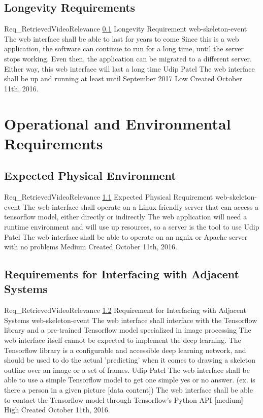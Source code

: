 \documentclass{scrreprt}
\begin{document}
\subsection{Longevity Requirements}
\label{req-longevity}
\requirement
{Req_RetrievedVideoRelevance}
{\ref{req-longevity} Longevity Requirement}
{web-skeleton-event}
{The web interface shall be able to last for years to come}
{Since this is a web application, the software can continue to run for a long time, until the server stops working. Even then, the application can be migrated to a different server. Either way, this web interface will last a long time}
{Udip Patel}
{The web interface shall be up and running at least until September 2017}
{Low}
{Created October 11th, 2016.}


\section{Operational and Environmental Requirements}

\subsection{Expected Physical Environment}
\label{req-op-env}

\requirement
{Req_RetrievedVideoRelevance}
{\ref{req-op-env} Expected Physical Requirement}
{web-skeleton-event}
{The web interface shall operate on a Linux-friendly server that can access a tensorflow model, either directly or indirectly}
{The web application will need a runtime environment and will use up resources, so a server is the tool to use }
{Udip Patel}
{The web interface shall be able to operate on an ngnix or Apache server with no problems}
{Medium}
{Created October 11th, 2016.}


\subsection{Requirements for Interfacing with Adjacent Systems}
\label{req-interfacing}

\requirement
{Req_RetrievedVideoRelevance}
{\ref{req-interfacing} Requirement for Interfacing with Adjacent Systems}
{web-skeleton-event}
{The web interface shall interface with the Tensorflow library and a pre-trained Tensorflow model specialized in image processing}
{The web interface itself cannot be expected to implement the deep learning. The Tensorflow library is a configurable and accessible deep learning network, and should be used to do the actual 'predicting' when it comes to drawing a skeleton outline over an image or a set of frames.}
{Udip Patel}
{The web interface shall be able to use a simple Tensorflow model to get one simple yes or no answer. (ex. is there a person in a given picture [data content]) The web interface shall be able to contact the Tensorflow model through Tensorflow's Python API [medium]}
{High}
{Created October 11th, 2016.}
\end{document}
